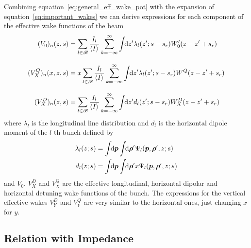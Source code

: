     Combining equation~\eqref{eq:general_eff_wake_pot} with the expansion of equation~\eqref{eq:important_wakes} we can derive expressions for each component of the effective wake functions of the beam
    \begin{subequations}\label{eq:general_eff_wakes}
    \begin{align}\label{eq:general_eff_long_wake}
	  	(V_0)_n(z, s) &= \sum_{l\in\mathscr{B}}\frac{I_l}{\left\langle I \right\rangle_{{}}}\sum_{k=-\infty}^\infty\int\!\!\text{d}z' \lambda_l(z'; s - s_r)W'_0(z - z' + s_r)
        \\[3mm]\label{eq:general_eff_quad_wake}
	  	(V^Q_X)_n(x, z, s) &= x\sum_{l\in\mathscr{B}}\frac{I_l}{\left\langle I \right\rangle_{{}}}\sum_{k=-\infty}^\infty\int\!\!\text{d}z' \lambda_l(z'; s - s_r)W^Q(z-z' + s_r)
        \\[3mm]\label{eq:general_eff_dip_wake}
	  	(V^D_X)_n(z, s) &= \sum_{l\in\mathscr{B}}\frac{I_l}{\left\langle I \right\rangle_{{}}}\sum_{k=-\infty}^\infty\int\!\!\text{d}z' d_l(z'; s - s_r)W^D_X(z-z' + s_r)
    \end{align}
    \end{subequations}
    where $\lambda_l$ is the longitudinal line distribution and $d_l$ is the horizontal dipole moment of the $l$-th bunch defined by
    \begin{align}\label{eq:definition_long_distributions}
	  	\lambda_l(z; s) = \udefint{\vect{p}}{\udefint{\vect{\rho}'}{
	  			&\Psi_l(\vect{p},\vect{\rho}',z; s)}}\\
	  	d_l(z; s) = \udefint{\vect{p}}{\udefint{\vect{\rho}'}{
	  			&x\Psi_l(\vect{p},\vect{\rho}',z; s)}}
    \end{align}
    and $V_0$, $V^D_X$ and $V^Q_X$ are the effective longitudinal, horizontal dipolar and horizontal detuning wake functions of the bunch. The expressions for the vertical effective wakes $V^D_Y$ and $V^Q_Y$ are very similar to the horizontal ones, just changing $x$ for $y$.

\subsection{Relation with Impedance}\label{ssec:relation_with_impedance}

